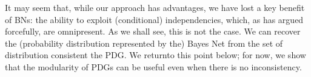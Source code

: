 \documentclass{article}
\newcommand{\MN}{PDG}
\newcommand{\MNs}{\MN s}
\numberwithin{equation}{section}
\begin{document}
	It may seem that, while our approach has advantages, we have lost a
	key benefit of BNs: the ability to exploit (conditional)
	independencies, which, as \textcite{pearl2014probabilistic} has argued
	forcefully, are omnipresent.  As we shall see, this is not the case.  
We can recover the (probability distribution represented by the)
Bayes Net from the set of distribution consistent the PDG.
We returnto this point below; for now, we show that 
the modularity of PDGs can be useful even when there is no
inconsistency.
\end{document}
